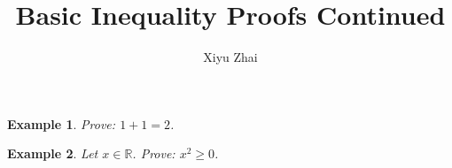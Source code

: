\documentclass{article}
\newtheorem{example}{Example}
\begin{document}
\title{Basic Inequality Proofs Continued}
\author{Xiyu Zhai}
\maketitle

\begin{example}
    Prove: $1+1=2$.
\end{example}


\begin{example}
    Let $x\in\mathbb{R}$. Prove: $x^2\ge 0$.
\end{example}
\end{document}
